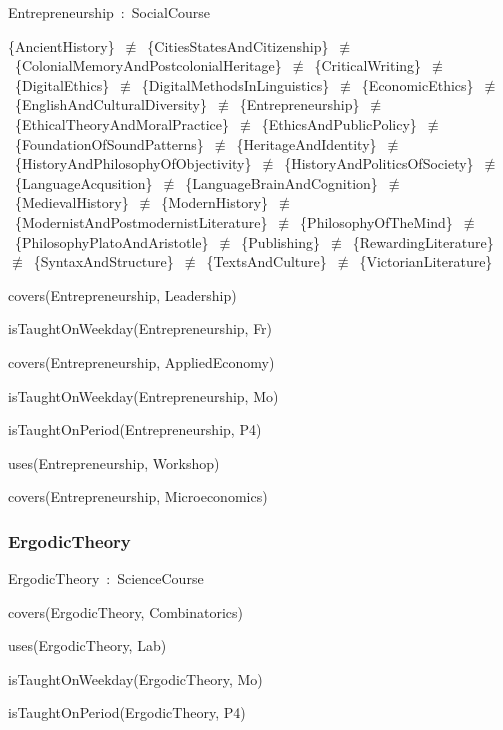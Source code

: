 \documentclass{article}
\begin{document}
Entrepreneurship~:~SocialCourse

\{AncientHistory\}~\ensuremath{\not\equiv}~\{CitiesStatesAndCitizenship\}~\ensuremath{\not\equiv}~\{ColonialMemoryAndPostcolonialHeritage\}~\ensuremath{\not\equiv}~\{CriticalWriting\}~\ensuremath{\not\equiv}~\{DigitalEthics\}~\ensuremath{\not\equiv}~\{DigitalMethodsInLinguistics\}~\ensuremath{\not\equiv}~\{EconomicEthics\}~\ensuremath{\not\equiv}~\{EnglishAndCulturalDiversity\}~\ensuremath{\not\equiv}~\{Entrepreneurship\}~\ensuremath{\not\equiv}~\{EthicalTheoryAndMoralPractice\}~\ensuremath{\not\equiv}~\{EthicsAndPublicPolicy\}~\ensuremath{\not\equiv}~\{FoundationOfSoundPatterns\}~\ensuremath{\not\equiv}~\{HeritageAndIdentity\}~\ensuremath{\not\equiv}~\{HistoryAndPhilosophyOfObjectivity\}~\ensuremath{\not\equiv}~\{HistoryAndPoliticsOfSociety\}~\ensuremath{\not\equiv}~\{LanguageAcqusition\}~\ensuremath{\not\equiv}~\{LanguageBrainAndCognition\}~\ensuremath{\not\equiv}~\{MedievalHistory\}~\ensuremath{\not\equiv}~\{ModernHistory\}~\ensuremath{\not\equiv}~\{ModernistAndPostmodernistLiterature\}~\ensuremath{\not\equiv}~\{PhilosophyOfTheMind\}~\ensuremath{\not\equiv}~\{PhilosophyPlatoAndAristotle\}~\ensuremath{\not\equiv}~\{Publishing\}~\ensuremath{\not\equiv}~\{RewardingLiterature\}~\ensuremath{\not\equiv}~\{SyntaxAndStructure\}~\ensuremath{\not\equiv}~\{TextsAndCulture\}~\ensuremath{\not\equiv}~\{VictorianLiterature\}

covers(Entrepreneurship, Leadership)

isTaughtOnWeekday(Entrepreneurship, Fr)

covers(Entrepreneurship, AppliedEconomy)

isTaughtOnWeekday(Entrepreneurship, Mo)

isTaughtOnPeriod(Entrepreneurship, P4)

uses(Entrepreneurship, Workshop)

covers(Entrepreneurship, Microeconomics)

\subsubsection*{ErgodicTheory}

ErgodicTheory~:~ScienceCourse

covers(ErgodicTheory, Combinatorics)

uses(ErgodicTheory, Lab)

isTaughtOnWeekday(ErgodicTheory, Mo)

isTaughtOnPeriod(ErgodicTheory, P4)
\end{document}

